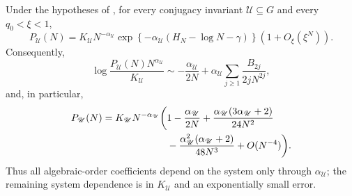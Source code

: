 \begin{theorem}
\label{thm:harmonic-renormalization}
Under the hypotheses of , for every conjugacy
invariant \(\mathscr U\subseteq G\) and every \(q_0<\xi<1\),
\begin{equation}\label{eq:harmonic-renormalized-product}
 P_{\mathscr U}(N)=K_{\mathscr U}N^{-\alpha_{\mathscr U}}
 \exp\left\{-\alpha_{\mathscr U}
   (H_N-\log N-\gamma)\right\}
 \left(1+O_\xi(\xi^N)\right).
\end{equation}
Consequently,
\begin{equation}\label{eq:harmonic-logarithmic-jet}
 \log\frac{P_{\mathscr U}(N)N^{\alpha_{\mathscr U}}}{K_{\mathscr U}}
 \sim-\frac{\alpha_{\mathscr U}}{2N}
 +\alpha_{\mathscr U}\sum_{j\ge1}
    \frac{B_{2j}}{2jN^{2j}},
\end{equation}
and, in particular,
\begin{align}
 P_{\mathscr U}(N)
 =K_{\mathscr U}N^{-\alpha_{\mathscr U}}
 \bigg(&1-\frac{\alpha_{\mathscr U}}{2N}
 +\frac{\alpha_{\mathscr U}(3\alpha_{\mathscr U}+2)}{24N^2}
 \notag\\
 &-\frac{\alpha_{\mathscr U}^2(\alpha_{\mathscr U}+2)}{48N^3}
 +O(N^{-4})\bigg).
 \label{eq:harmonic-product-jet-three}
\end{align}
Thus all algebraic-order coefficients depend on the system only through
\(\alpha_{\mathscr U}\); the remaining system dependence is in
\(K_{\mathscr U}\) and an exponentially small error.
\end{theorem}

